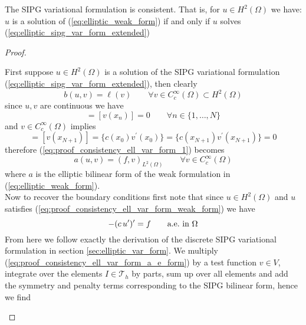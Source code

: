 \begin{theorem}
	\label{thr:elliptic_consistency_sipg_variational_formulation}
	The SIPG variational formulation is consistent. That is, for $u \in H^2(\Omega)$ we have: \\
	$u$ is a solution of (\ref{eq:elliptic_weak_form}) if and only if $u$ solves (\ref{eq:elliptic_sipg_var_form_extended})
\end{theorem}
\begin{proof}
	\begin{proofstep}["$\Leftarrow$"]
		\noindent First suppose $u\in H^2(\Omega)$ is a solution of the SIPG variational formulation (\ref{eq:elliptic_sipg_var_form_extended}), then clearly 
		\begin{equation}
			\label{eq:proof_consistency_ell_var_form_1}
			b(u,v) = \ell(v) \qquad \forall v \in C_c^{\infty}(\Omega) \subset H^2(\Omega)
		\end{equation}
		since $u,v$ are continuous we have 
		\begin{equation*}
		[u(x_n)] = [v(x_n)] = 0 \qquad  \forall n \in \{1,\ldots,N\}	
		\end{equation*}
		and $v \in C_c^{\infty}(\Omega)$ implies 
		\begin{equation*}
		[v(x_0)] = [v(x_{N+1})] = \{c(x_0)v^{\prime}(x_0)\} = \{c(x_{N+1})v^{\prime}(x_{N+1})\} = 0	
		\end{equation*}
		therefore (\ref{eq:proof_consistency_ell_var_form_1}) becomes
		\begin{equation}
			\label{eq:proof_consistency_ell_var_form_weak_form}
			a(u,v) = (f,v)_{L^2(\Omega)} \qquad \forall v \in C_c^{\infty}(\Omega)
		\end{equation}
		where $a$ is the elliptic bilinear form of the weak formulation in (\ref{eq:elliptic_weak_form}). \\
		Now to recover the boundary conditions first note that since $u \in H^2(\Omega)$ and  $u$ satisfies (\ref{eq:proof_consistency_ell_var_form_weak_form}) 
		we have 
		\begin{equation}
			\label{eq:proof_consistency_ell_var_form_a_e_form}
			-(c\, u')' = f \qquad \text{a.e.\@ in } \Omega  
		\end{equation}
		From here we follow exactly the derivation of the discrete SIPG variational formulation in section \ref{sec:elliptic_var_form}.
		We multiply (\ref{eq:proof_consistency_ell_var_form_a_e_form}) by a test function $v \in V$, integrate over the elements $I \in \mathcal{T}_h$ by parts, 
		sum up over all elements and add the symmetry and penalty terms corresponding to the SIPG bilinear form, hence we find

\end{proofstep}
\end{proof}
